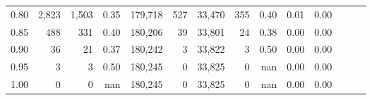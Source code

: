 \begin{tabular}{rrrrrrrrrrrrrr}
0.80 &   2,823 &  1,503 &  0.35 &  179,718 &      527 &  33,470 &     355 &  0.40 &  0.01 &      0.00 \\
0.85 &     488 &    331 &  0.40 &  180,206 &       39 &  33,801 &      24 &  0.38 &  0.00 &      0.00 \\
0.90 &      36 &     21 &  0.37 &  180,242 &        3 &  33,822 &       3 &  0.50 &  0.00 &      0.00 \\
0.95 &       3 &      3 &  0.50 &  180,245 &        0 &  33,825 &       0 &   nan &  0.00 &      0.00 \\
1.00 &       0 &      0 &   nan &  180,245 &        0 &  33,825 &       0 &   nan &  0.00 &      0.00 \\
\bottomrule
\end{tabular}

